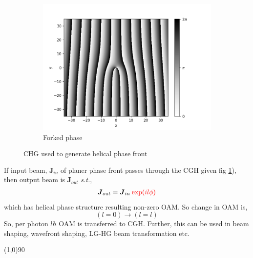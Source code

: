 \documentclass[11pt,a4paper]{article}
\numberwithin{equation}{section}
\begin{document}
\begin{figure}[H]
\begin{subfigure}[H]{0.31\textwidth}
		\includegraphics[width=\textwidth]{cgh_mixed.png}
		\caption{Forked phase}
		\label{fig:cgh,mixed}
	\end{subfigure}
	\caption{CHG used to generate helical phase front}
	\label{fig:CGH}
\end{figure}

If input beam, $\boldsymbol{J}_{in}$ of planer phase front passes through the CGH given fig \ref{fig:cgh,mixed}), then output beam is $\boldsymbol{J}_{out}$ \textit{s.t.},
\begin{align}
	\boldsymbol{J}_{out}=\boldsymbol{J}_{in}\:{\color{red} \exp(il\phi)}
\end{align}
which has helical phase structure resulting non-zero OAM. So change in OAM is,
$$(l=0)\longrightarrow (l=l)$$
So, per photon $l\hbar$ OAM is transferred to CGH. Further, this can be used in beam shaping, wavefront shaping, LG-HG beam transformation etc. \cite{yao 11}\cite{allen 99}

\begin{center}
	\line(1,0){90}
\end{center}



\clearpage
\let\oldbibliography\thebibliography
\renewcommand{\thebibliography}[1]{%
	\oldbibliography{#1}%
	\setlength{\itemsep}{0pt}%
}
\small
{}\selectfont
\end{document}
